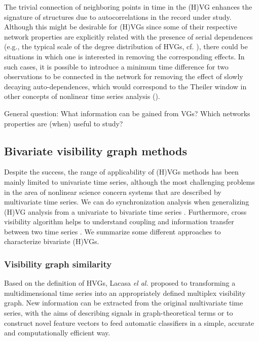 		The trivial connection of neighboring points in time in the (H)VG enhances the signature of structures due to autocorrelations in the record under study. Although this might be desirable for (H)VGs since some of their respective network properties are explicitly related with the presence of serial dependences (e.g., the typical scale of the degree distribution of HVGs, cf. \cite{Luque2009}), there could be situations in which one is interested in removing the corresponding effects. In such cases, it is possible to introduce a minimum time difference for two observations to be connected in the network for removing the effect of slowly decaying auto-dependences, which would correspond to the Theiler window in other concepts of nonlinear time series analysis (\cite{Theiler1986}).

		{\color{red}General question: What information can be gained from VGs? Which networks properties are (when) useful to study? }

	\subsection{Bivariate visibility graph methods}
	Despite the success, the range of applicability of (H)VGs methods has been mainly limited to univariate time series, although the most challenging problems in the area of nonlinear science concern systems that are described by multivariate time series. We can do synchronization analysis when generalizing (H)VG analysis from a univariate to bivariate time series \cite{Ahmadlou2012a,Mitra2012}. Furthermore, cross visibility algorithm helps to understand coupling and information transfer between two time series \cite{Mehraban2013}. We summarize some different approaches to characterize bivariate (H)VGs. 
	
		\subsubsection{Visibility graph similarity}
		Based on the definition of HVGs, Lacasa \textit{el al.} \cite{Lacasa2015b} proposed to transforming a multidimensional time series into an appropriately defined multiplex visibility graph. New information can be extracted from the original multivariate time series, with the aims of describing signals in graph-theoretical terms or to construct novel feature vectors to feed automatic classifiers in a simple, accurate and computationally efficient way. 
		
